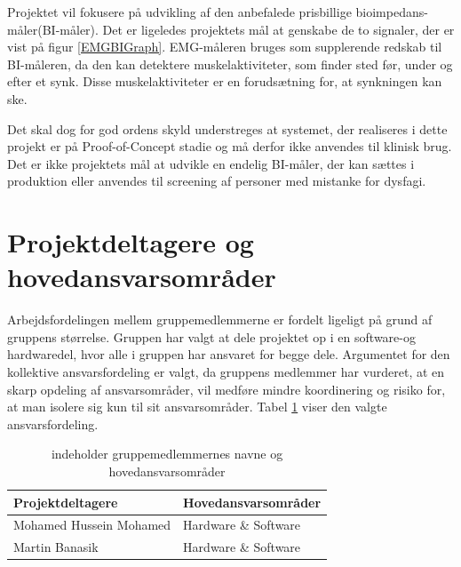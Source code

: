 Projektet vil fokusere på udvikling af den anbefalede prisbillige bioimpedans-måler(BI-måler). Det er ligeledes projektets mål at genskabe de to signaler, der er vist på figur \ref{EMGBIGraph}. EMG-måleren bruges som supplerende redskab til BI-måleren, da den kan detektere muskelaktiviteter, som finder sted før, under og efter et synk. Disse muskelaktiviteter er en forudsætning for, at synkningen kan ske. 

Det skal dog for god ordens skyld understreges at systemet, der realiseres i dette projekt er på Proof-of-Concept stadie og må derfor ikke anvendes til klinisk brug. Det er ikke projektets mål at udvikle en endelig BI-måler, der kan sættes i produktion eller anvendes til screening af personer med mistanke for dysfagi. 

\section{Projektdeltagere og hovedansvarsområder} 
Arbejdsfordelingen  mellem gruppemedlemmerne er fordelt ligeligt på grund af gruppens størrelse. Gruppen har valgt at dele projektet op i en software-og hardwaredel, hvor alle i gruppen har ansvaret for  begge dele. Argumentet for den kollektive ansvarsfordeling er valgt, da gruppens medlemmer har vurderet, at en skarp opdeling af ansvarsområder, vil medføre mindre koordinering og risiko for, at man isolere sig kun til sit ansvarsområder. Tabel \ref{Ansvarsfordeling} viser den valgte ansvarsfordeling. 

\begin{table}[H]
\centering

\begin{tabular}{|l|l|}
\hline
\textbf{Projektdeltagere}        & \textbf{Hovedansvarsområder}  \\ \hline
Mohamed Hussein Mohamed & Hardware \& Software \\ \hline
Martin Banasik          & Hardware \& Software \\ \hline


\end{tabular}

\caption{indeholder gruppemedlemmernes navne og hovedansvarsområder }
\label{Ansvarsfordeling}
\end{table}


